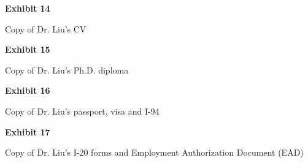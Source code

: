 \documentclass{article}
\begin{document}




\vspace*{\fill}

\begin{center}

{\LARGE \bf
Exhibit 14
}

\vspace{10\baselineskip}

{\large Copy of Dr. Liu’s CV}

\end{center}
\vspace*{\fill}



\vspace*{\fill}

\begin{center}

{\LARGE \bf
Exhibit 15
}

\vspace{10\baselineskip}

{\large Copy of Dr. Liu’s Ph.D. diploma}

\end{center}
\vspace*{\fill}



\vspace*{\fill}

\begin{center}

{\LARGE \bf
Exhibit 16
}

\vspace{10\baselineskip}

{\large Copy of Dr. Liu’s passport, visa and I-94}

\end{center}
\vspace*{\fill}



\vspace*{\fill}

\begin{center}

{\LARGE \bf
Exhibit 17
}

\vspace{10\baselineskip}

{\large Copy of Dr. Liu’s I-20 forms and Employment Authorization Document (EAD)}

\end{center}
\vspace*{\fill}
\end{document}
